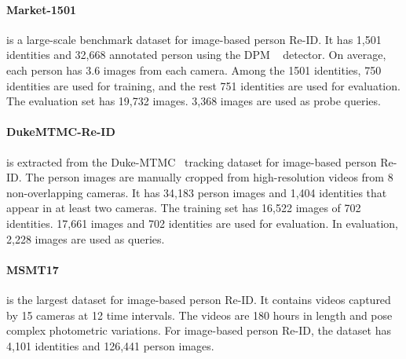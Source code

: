 \documentclass[a4paper,fleqn]{cas-dc}
\begin{document}
\paragraph{Market-1501~\cite{zheng_scalable_2015}} is a large-scale benchmark dataset for image-based person Re-ID. It has 1,501 identities and 32,668 annotated person using the DPM ~\cite{girshick_deformable_2014} detector. On average, each person has 3.6 images from each camera. Among the 1501 identities, 750 identities are used for training, and the rest 751 identities are used for evaluation. The evaluation set has 19,732 images. 3,368 images are used as probe queries.

\paragraph{DukeMTMC-Re-ID~\cite{zheng_unlabeled_2017}} is extracted from the Duke-MTMC~\cite{ristani_performance_2016} tracking dataset for image-based person Re-ID. The person images are manually cropped from high-resolution videos from 8 non-overlapping cameras. It has 34,183 person images and 1,404 identities that appear in at least two cameras. The training set has 16,522 images of 702 identities. 17,661 images and 702 identities are used for evaluation. In evaluation, 2,228 images are used as queries.
\paragraph{MSMT17~\cite{wei_person_2018}} is the largest dataset for image-based person Re-ID. It contains videos captured by 15 cameras at 12 time intervals. The videos are 180 hours in length and pose complex photometric variations. For image-based person Re-ID, the dataset has 4,101 identities and 126,441 person images.
\end{document}
